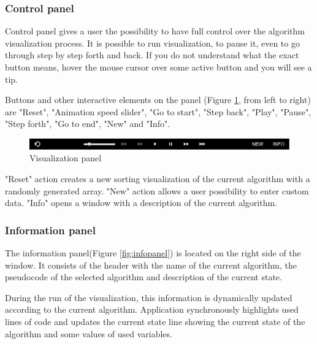 \documentclass[
  field=inf,
  biblatex,
  language=english,
  glossaries,
  theorems=false,
  sourcecodes=false,
  index
]{kidiplom}
\begin{document}
\subsubsection{Control panel}

Control panel gives a user the possibility to have full control over the algorithm visualization process. It is possible to run visualization, to pause it, even to go through step by step forth and back. If you do not understand what the exact button means, hover the mouse cursor over some active button and you will see a tip.

Buttons and other interactive elements on the panel (Figure \ref{fig:controls}, from left to right) are "Reset", "Animation speed slider", "Go to start", "Step back", "Play", "Pause", "Step forth", "Go to end", "New" and "Info".

\begin{figure}[H]
\begin{center}
	\includegraphics[scale=0.5]{img/ui/Controls.png}
	\caption{Visualization panel}\label{fig:controls}
\end{center}
\end{figure}

"Reset" action creates a new sorting visualization of the current algorithm with a randomly generated array. "New" action allows a user possibility to enter custom data. "Info" opens a window with a description of the current algorithm.

\subsubsection{Information panel}

The information panel(Figure \ref{fig:infopanel}) is located on the right side of the window. It consists of the header with the name of the current algorithm, the pseudocode of the selected algorithm and description of the current state.

During the run of the visualization, this information is dynamically updated according to the current algorithm. Application synchronously highlights used lines of code and updates the current state line showing the current state of the algorithm and some values of used variables.
\end{document}
